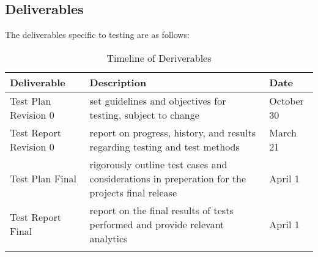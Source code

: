 \documentclass[12pt]{article}
\begin{document}
\subsection{Deliverables} %
The deliverables specific to testing are as follows:\\
\begin{table}[h]
\centering
\caption{Timeline of Deriverables}
\begin{tabular}{|l|l|l|}
\Xhline{2\arrayrulewidth}
\bf Deliverable & \bf Description & \bf Date\\\hline
Test Plan Revision 0 & set guidelines and objectives for testing, subject to change & October 30\\
Test Report Revision 0 & report on progress, history, and results regarding testing and test methods & March 21\\
Test Plan Final & rigorously outline test cases and considerations in preperation for the projects final release & April 1\\
Test Report Final & report on the final results of tests performed and provide relevant analytics & April 1\\
\Xhline{2\arrayrulewidth}
\end{tabular}
\end{table}
\end{document}
